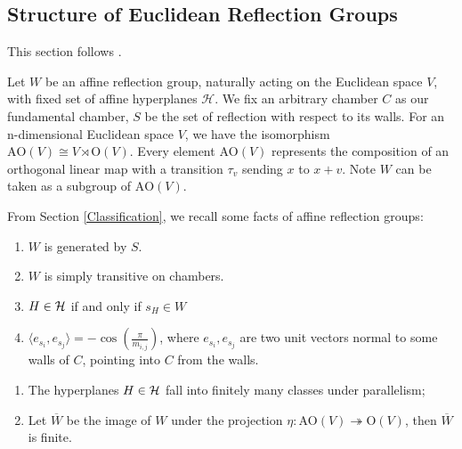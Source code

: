 \documentclass[../main.tex]{subfiles}
\begin{document}
\subsection{Structure of Euclidean Reflection Groups}

This section follows \cite{AbramenkoBrown2008}.

Let $W$ be an affine reflection group, naturally acting on the Euclidean space $V$, with fixed set of affine hyperplanes $\mathcal H$. We fix an arbitrary chamber $C$ as our fundamental chamber, $S$ be the set of reflection with respect to its walls. For an n-dimensional Euclidean space $V$, we have the isomorphism $\text{AO}(V) \cong V \rtimes \text{O}(V)$. Every element $\text{AO}(V)$ represents the composition of an orthogonal linear map with a transition $\tau_v$ sending $x$ to $x+v$. Note $W$ can be taken as a subgroup of $\text{AO}(V)$.

From Section \ref{Classification}, we recall some facts of affine reflection groups:\begin{enumerate}
    \item $W$ is generated by $S$.
    \item $W$ is simply transitive on chambers.
    \item $H\in \mathcal{H}$ if and only if $s_H \in W$
    \item $\langle e_{s_i},e_{s_j}\rangle=-\cos(\frac{\pi}{m_{i,j}})$, where $e_{s_i},e_{s_j}$ are two unit vectors normal to some walls of $C$, pointing into $C$ from the walls. 
\end{enumerate}

\begin{theorem}\label{thm:finpara}
    \begin{enumerate}
        \item The hyperplanes $H\in \mathcal{H}$ fall into finitely many classes under parallelism;
        \item Let $\overline W$ be the image of $W$ under the projection $\eta: \text{AO}(V) \twoheadrightarrow \text{O} (V)$, then $\overline W$ is finite.
    \end{enumerate}
\end{theorem}
\end{document}
